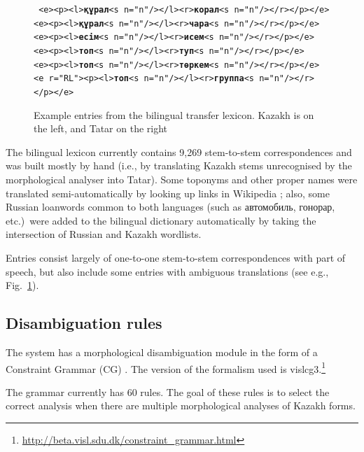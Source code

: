\documentclass[11pt]{article}
\begin{document}
\begin{figure}[htbp]
\hspace{3cm}\parbox[t]{0.7\textwidth}{{\tt
    <e><p><l>\textbf{құрал}<s n="n"/></l><r>\textbf{корал}<s n="n"/></r></p></e> \\
    <e><p><l>\textbf{құрал}<s n="n"/></l><r>\textbf{чара}<s n="n"/></r></p></e> \\
    <e><p><l>\textbf{есім}<s n="n"/></l><r>\textbf{исем}<s n="n"/></r></p></e> \\
    <e><p><l>\textbf{топ}<s n="n"/></l><r>\textbf{туп}<s n="n"/></r></p></e> \\
    <e><p><l>\textbf{топ}<s n="n"/></l><r>\textbf{төркем}<s n="n"/></r></p></e> \\
    <e r="RL"><p><l>\textbf{топ}<s n="n"/></l><r>\textbf{группа}<s n="n"/></r></p></e>
}}%
\caption{Example entries from the bilingual transfer lexicon. Kazakh is on the left, and Tatar on the right}
\label{fig:bidix}
\end{figure}

The bilingual lexicon currently contains 9,269 stem-to-stem correspondences and was built mostly 
by hand (i.e., by translating Kazakh stems unrecognised by the morphological analyser into Tatar).  Some 
toponyms and other proper names were translated semi-automatically by looking up links in Wikipedia \citep{tyers08}; also, 
some Russian loanwords common to both languages (such as автомобиль, гонорар, etc.)\ were added to the bilingual 
dictionary automatically by taking the intersection of Russian and Kazakh wordlists.

Entries consist largely of one-to-one stem-to-stem correspondences with part of speech, but also include some entries with ambiguous translations (see e.g., Fig.~\ref{fig:bidix}).

\subsection{Disambiguation rules}

The system has a morphological disambiguation module in the form of a 
Constraint Grammar (CG) \citep{karlsson95}. The version of the formalism used is vislcg3.\footnote{\url{http://beta.visl.sdu.dk/constraint_grammar.html}}

The grammar currently has 60 rules.  The goal of these rules is to select the correct analysis when there 
are multiple morphological analyses of Kazakh forms.
\end{document}
